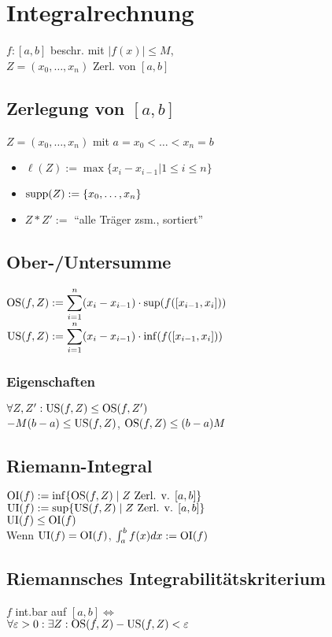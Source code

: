 \section*{Integralrechnung}

$f:[a,b]$ beschr. mit $|f(x)|\le M$,\\
$Z=(x_0,\ldots,x_n)$ Zerl. von $[a,b]$

\subsection*{Zerlegung von $[a,b]$}
$Z=(x_0, \ldots, x_n)$ mit $a=x_0<\ldots<x_n=b$
\begin{itemize}
	\item $\ell(Z):=\max\{x_i - x_{i-1}|1\le i \le n\}$
	\item $\operatorname{supp}(Z) := \{x_0,\ldots,x_n\}$
	\item $Z*Z' :=$ \enquote{alle Träger zsm., sortiert}
\end{itemize}

\subsection*{Ober-/Untersumme}
$\displaystyle \operatorname{OS}(f,Z) := \sum_{i=1}^n(x_i-x_{i-1})\cdot\sup(f([x_{i-1},x_i]))$ \\
$\displaystyle \operatorname{US}(f,Z) := \sum_{i=1}^n(x_i-x_{i-1})\cdot\inf(f([x_{i-1},x_i]))$

\subsubsection*{Eigenschaften}
$\forall Z,Z': \operatorname{US}(f,Z)\le\operatorname{OS}(f,Z')$ \\
$-M(b-a)\le \operatorname{US}(f,Z)$, $\operatorname{OS}(f,Z)\le (b-a)M$

\subsection*{Riemann-Integral}
$\operatorname{OI}(f) := \inf\{\operatorname{OS}(f,Z) \mid Z \text{ Zerl. v. }[a,b]\}$ \\
$\operatorname{UI}(f) := \sup\{\operatorname{US}(f,Z) \mid Z \text{ Zerl. v. }[a,b]\}$ \\
$\operatorname{UI}(f)\le\operatorname{OI}(f)$ \\
Wenn $\operatorname{UI}(f)=\operatorname{OI}(f)$, $\int_a^bf(x)dx := \operatorname{OI}(f)$

\subsection*{Riemannsches Integrabilitätskriterium}
$f$ int.bar auf $[a,b] \iff$ \\
$\forall \varepsilon>0:\exists Z: \operatorname{OS}(f,Z)-\operatorname{US}(f,Z)<\varepsilon$

